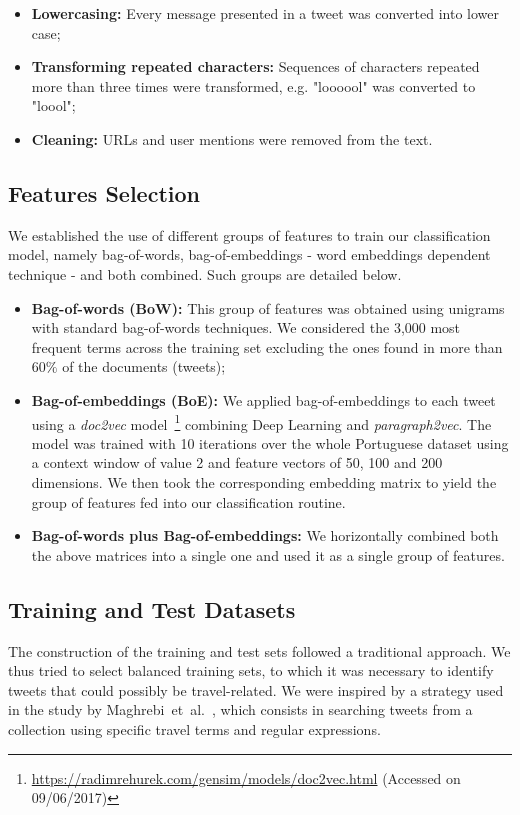 \begin{itemize}
\item \textbf{Lowercasing:} Every message presented in a tweet was converted into lower case;
\item \textbf{Transforming repeated characters:} Sequences of characters repeated more than three times were transformed, e.g. "loooool" was converted to "loool";
\item \textbf{Cleaning:} URLs and user mentions were removed from the text.
\end{itemize}

\subsection{Features Selection}\label{subsec:features_4_3_2}
We established the use of different groups of features to train our classification model, namely bag-of-words, bag-of-embeddings - word embeddings dependent technique - and both combined. Such groups are detailed below.

\begin{itemize}
\item \textbf{Bag-of-words (BoW):} This group of features was obtained using unigrams with standard bag-of-words techniques. We considered the 3,000 most frequent terms across the training set excluding the ones found in more than 60$\%$ of the documents (tweets);

\item \textbf{Bag-of-embeddings (BoE):} We applied bag-of-embeddings to each tweet using a \textit{doc2vec} model~\footnote{\url{https://radimrehurek.com/gensim/models/doc2vec.html} (Accessed on 09/06/2017)} combining Deep Learning and \textit{paragraph2vec}. The model was trained with 10 iterations over the whole Portuguese dataset using a context window of value 2 and feature vectors of 50, 100 and 200 dimensions. We then took the corresponding embedding matrix to yield the group of features fed into our classification routine. 

\item \textbf{Bag-of-words plus Bag-of-embeddings:} We horizontally combined both the above matrices into a single one and used it as a single group of features.
\end{itemize}

\subsection{Training and Test Datasets}\label{subsec:training_test_datasets_portuguese}
The construction of the training and test sets followed a traditional approach. We thus tried to select balanced training sets, to which it was necessary to identify tweets that could possibly be travel-related. We were inspired by a strategy used in the study by Maghrebi~et~al.~\cite{maghrebi2016transportation}, which consists in searching tweets from a collection using specific travel terms and regular expressions.


